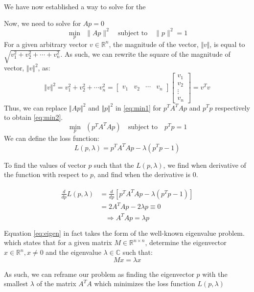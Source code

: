 We have now established a way to solve for the

Now, we need to solve for $Ap = 0$
\begin{equation} \label{eq:min1}
    \min_{p}\:\: \lVert Ap \rVert^2  \quad \text{subject to} \quad \lVert p \rVert^2 = 1
\end{equation}
For a given arbitrary vector $v \in \mathbb{R}^n$, the magnitude of the vector, $\Vert v \Vert$, is equal to
$\sqrt{v_1^2+v_2^2+ \cdots + v_n^2}$. As such, we can rewrite the square of the magnitude of vector, $\Vert v \Vert ^2$, as:
\begin{equation*} 
    \Vert v \Vert^2 
    = v_1^2+v_2^2+ \cdots v_n^2 
    = 
    \begin{bmatrix}
        v_1 & v_2 & \cdots & v_n     
    \end{bmatrix}
    \begin{bmatrix}
        v_1 \\ v_2 \\ \vdots \\ v_n
    \end{bmatrix}
    = v^T v
\end{equation*} 
Thus, we can replace $\Vert Ap \Vert ^2$ and $\Vert p \Vert ^2$ in \ref{eq:min1} for $p^T A^T Ap$ and $p^T p$ respectively to obtain \ref{eq:min2}. 
\begin{equation} \label{eq:min2}
    \min_{p}\:\: \left(p^T A^T Ap\right)\quad \text{subject to} \quad p^T p = 1
\end{equation} 
We can define the loss function:
\begin{equation}
    L(p, \lambda) = p^T A^T Ap - \lambda \left( p^T p - 1 \right)
\end{equation}

To find the values of vector $p$ such that the $L(p,\lambda)$, we find when derivative of the function with respect to $p$, and find when the derivative is 0.

\begin{align}
    \begin{split}
        \frac{d}{dp}L(p,\lambda) &= \frac{d}{dp} \left[ p^T A^T Ap - \lambda \left( p^T p - 1 \right) \right] \\
        &= 2A^TAp - 2 \lambda p \equiv 0
    \end{split}
\end{align}
\begin{equation}
    \Rightarrow A^T A p = \lambda p \label{eq:eigen}
\end{equation}

Equation \ref{eq:eigen} in fact takes the form of the well-known eigenvalue problem.  which states that for a given matrix $M \in \mathbb{R}^{n \times n}$, determine the eigenvector $x \in \mathbb{R}^n, x \neq 0$ and the eigenvalue $\lambda \in \mathbb{C}$ such that:
\begin{equation*}
    Mx = \lambda x
\end{equation*}

As such, we can reframe our problem as finding the eigenvector $p$ with the smallest $\lambda$ of the matrix $A^TA$ which minimizes the loss function $L(p,\lambda)$



